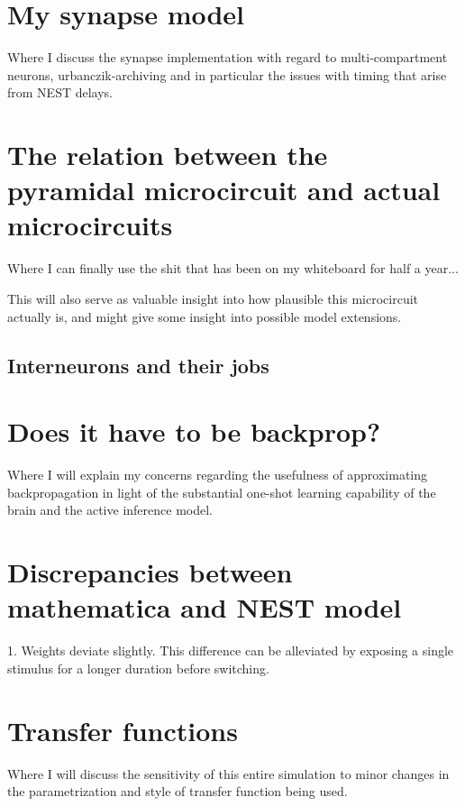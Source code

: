 \documentclass[11pt,a4paper,titlepage]{report}
\begin{document}
\section{My synapse model}

Where I discuss the synapse implementation with regard to multi-compartment neurons,
urbanczik-archiving and in particular the issues with timing that arise from NEST delays.


\section{The relation between the pyramidal microcircuit and actual microcircuits}

Where I can finally use the shit that has been on my whiteboard for half a year...

This will also serve as valuable insight into how plausible this microcircuit actually is,
and might give some insight into possible model extensions.

\subsection{Interneurons and their jobs}

\section{Does it have to be backprop?}

Where I will explain my concerns regarding the usefulness of approximating backpropagation
in light of the substantial one-shot learning capability of the brain and the active inference
model.


\section{Discrepancies between mathematica and NEST model}

1. Weights deviate slightly. This difference can be alleviated by exposing a single stimulus for a longer duration before switching.

\section{Transfer functions}

Where I will discuss the sensitivity of this entire simulation to minor changes in the
parametrization and style of transfer function being used.
\end{document}
